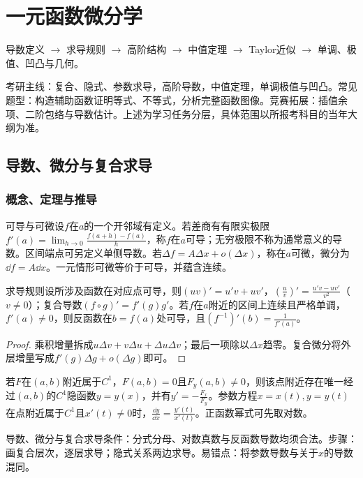 \chapter{一元函数微分学}\label{ch:2}
\begin{tcolorbox}[title=章首知识地图,colframe=Ink]
导数定义 $\to$ 求导规则 $\to$ 高阶结构 $\to$ 中值定理 $\to$ Taylor近似 $\to$ 单调、极值、凹凸与几何。
\end{tcolorbox}
\begin{examtip}考研主线：复合、隐式、参数求导，高阶导数，中值定理，单调极值与凹凸。常见题型：构造辅助函数证明等式、不等式，分析完整函数图像。竞赛拓展：插值余项、二阶包络与导数估计。上述为学习任务分层，具体范围以所报考科目的当年大纲为准。\end{examtip}
\section{导数、微分与复合求导}\label{sec:2:1}
\subsection{概念、定理与推导}

\begin{definition}{可导与可微}设$f$在$a$的一个开邻域有定义。若差商有有限实极限$f\prime(a)=\lim_{h\to0}\frac{f(a+h)-f(a)}{h}$，称$f$在$a$可导；无穷极限不称为通常意义的导数。区间端点可另定义单侧导数。若$\Delta f=A\Delta x+o(\Delta x)$，称在$a$可微，微分为$\dd f=A\dd x$。一元情形可微等价于可导，并蕴含连续。\end{definition}
\begin{theorem}{求导规则}设所涉及函数在对应点可导，则$ (uv)\prime=u\prime v+uv\prime$，$(\frac{u}{v})\prime=\frac{u\prime v-uv\prime}{v^2}$（$v\ne0$）；复合导数$(f\circ g)\prime=f\prime(g)g\prime$。若$f$在$a$附近的区间上连续且严格单调，$f\prime(a)\ne0$，则反函数在$b=f(a)$处可导，且$(f^{-1})\prime(b)=\frac{1}{f\prime(a)}$。\end{theorem}
\begin{proof}乘积增量拆成$u\Delta v+v\Delta u+\Delta u\Delta v$；最后一项除以$\Delta x$趋零。复合微分将外层增量写成$f\prime(g)\Delta g+o(\Delta g)$即可。\end{proof}
若$F$在$(a,b)$附近属于$C^1$，$F(a,b)=0$且$F_y(a,b)\ne0$，则该点附近存在唯一经过$(a,b)$的$C^1$隐函数$y=y(x)$，并有$y\prime=-\frac{F_x}{F_y}$。参数方程$x=x(t),y=y(t)$在点附近属于$C^1$且$x\prime(t)\ne0$时，$\frac{\dd y}{\dd x}=\frac{y\prime(t)}{x\prime(t)}$。正函数幂式可先取对数。

\begin{method}{导数、微分与复合求导}条件：分式分母、对数真数与反函数导数均须合法。步骤：画复合层次，逐层求导；隐式关系两边求导。易错点：将参数导数与关于$x$的导数混同。\end{method}



